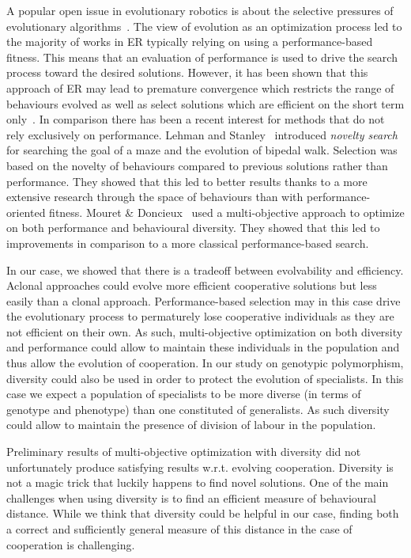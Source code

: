 			A popular open issue in evolutionary robotics is about the selective pressures of evolutionary algorithms~\parencite{Doncieux2015a}. The view of evolution as an optimization process led to the majority of works in ER typically relying on using a performance-based fitness. This means that an evaluation of performance is used to drive the search process toward the desired solutions. However, it has been shown that this approach of ER may lead to premature convergence which restricts the range of behaviours evolved as well as select solutions which are efficient on the short term only~\parencite{Mouret2012a}. In comparison there has been a recent interest for methods that do not rely exclusively on performance. Lehman and Stanley~\parencite{Lehman2011} introduced \emph{novelty search} for searching the goal of a maze and the evolution of bipedal walk. Selection was based on the novelty of behaviours compared to previous solutions rather than performance. They showed that this led to better results thanks to a more extensive research through the space of behaviours than with performance-oriented fitness. Mouret \& Doncieux~\parencite{Mouret2012a} used a multi-objective approach to optimize on both performance and behavioural diversity. They showed that this led to improvements in comparison to a more classical performance-based search.

			In our case, we showed that there is a tradeoff between evolvability and efficiency. Aclonal approaches could evolve more efficient cooperative solutions but less easily than a clonal approach. Performance-based selection may in this case drive the evolutionary process to permaturely lose cooperative individuals as they are not efficient on their own. As such, multi-objective optimization on both diversity and performance could allow to maintain these individuals in the population and thus allow the evolution of cooperation. In our study on genotypic polymorphism, diversity could also be used in order to protect the evolution of specialists. In this case we expect a population of specialists to be more diverse (in terms of genotype and phenotype) than one constituted of generalists. As such diversity could allow to maintain the presence of division of labour in the population.

			Preliminary results of multi-objective optimization with diversity did not unfortunately produce satisfying results w.r.t. evolving cooperation. Diversity is not a magic trick that luckily happens to find novel solutions. One of the main challenges when using diversity is to find an efficient measure of behavioural distance. While we think that diversity could be helpful in our case, finding both a correct and sufficiently general measure of this distance in the case of cooperation is challenging.


